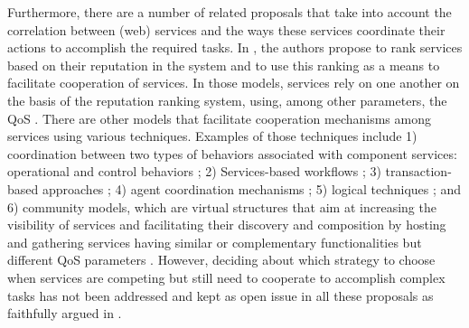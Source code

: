 Furthermore, there are a number of related proposals that take
into account the correlation between (web) services and the ways
these services coordinate their actions to accomplish the required
tasks. In \cite{Jurca2007b,Jurca2005d,DBLP:conf/wise/MalikB07,Maximilien:2001:REW:844331.844335,journals/kbs/Yahyaoui12}, the
authors propose to rank services based on their reputation in the
system and to use this ranking as a means to facilitate
cooperation of services. In those models, services rely on one
another on the basis of the reputation ranking system, using,
among other parameters, the QoS \cite{Tao:2012:NPA:2064113.2064479}. There are
other models that facilitate cooperation mechanisms among services
using various techniques. Examples of those techniques include 1)
coordination between two types of behaviors associated with
component services: operational and control behaviors
\cite{DBLP:journals/ijwgs/YahyaouiMB10}; 2) Services-based workflows \cite{Wu2011}; 3)
transaction-based approaches \cite{Gao:2011:STI:2093449.2093450,DBLP:conf/icws/RosarioBHJ07}; 4) agent
coordination mechanisms \cite{DBLP:journals/aamas/CharifS13,DBLP:journals/apin/Gutierrez-GarciaS13}; 5)
logical techniques \cite{Okutan:2010:MAA:1805335.1805430,tang:automatic}; and 6) community models,
which are virtual structures that aim at increasing the visibility
of services and facilitating their discovery and composition by
hosting and gathering services having similar or complementary
functionalities but different QoS parameters
\cite{DBLP:journals/jwsr/KhosravifarBMT10}. %
However, deciding about which strategy to choose when services are
competing but still need to cooperate to accomplish complex tasks
has not been addressed and kept as open issue in all these
proposals as faithfully argued in
\cite{1fd085d030db49d9ad024f89d13faff3,DBLP:conf/icsoc/KhosravifarAABMO12}.




